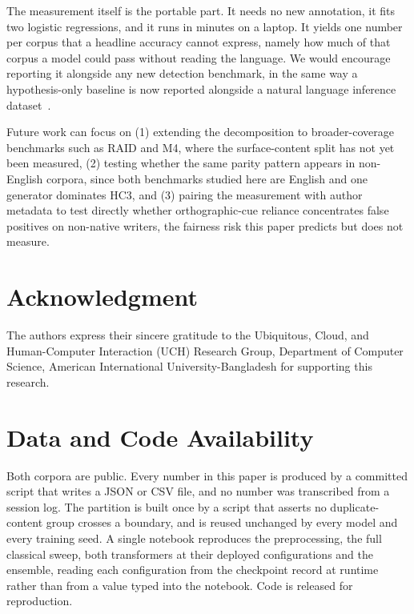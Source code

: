 \documentclass[conference,a4paper]{IEEEtran}
\begin{document}
The measurement itself is the portable part. It needs no new annotation, it fits two logistic regressions, and it runs in minutes on a laptop. It yields one number per corpus that a headline accuracy cannot express, namely how much of that corpus a model could pass without reading the language. We would encourage reporting it alongside any new detection benchmark, in the same way a hypothesis-only baseline is now reported alongside a natural language inference dataset~\cite{Poliak2018hypothesis}.

Future work can focus on (1) extending the decomposition to broader-coverage benchmarks such as RAID and M4, where the surface-content split has not yet been measured, (2) testing whether the same parity pattern appears in non-English corpora, since both benchmarks studied here are English and one generator dominates HC3, and (3) pairing the measurement with author metadata to test directly whether orthographic-cue reliance concentrates false positives on non-native writers, the fairness risk this paper predicts but does not measure.

\section*{Acknowledgment}
The authors express their sincere gratitude to the Ubiquitous, Cloud, and Human-Computer Interaction (UCH) Research Group, Department of Computer Science, American International University-Bangladesh for supporting this research.

\section*{Data and Code Availability}
Both corpora are public. Every number in this paper is produced by a committed script that writes a JSON or CSV file, and no number was transcribed from a session log. The partition is built once by a script that asserts no duplicate-content group crosses a boundary, and is reused unchanged by every model and every training seed. A single notebook reproduces the preprocessing, the full classical sweep, both transformers at their deployed configurations and the ensemble, reading each configuration from the checkpoint record at runtime rather than from a value typed into the notebook. Code is released for reproduction.

\balance


\end{document}
